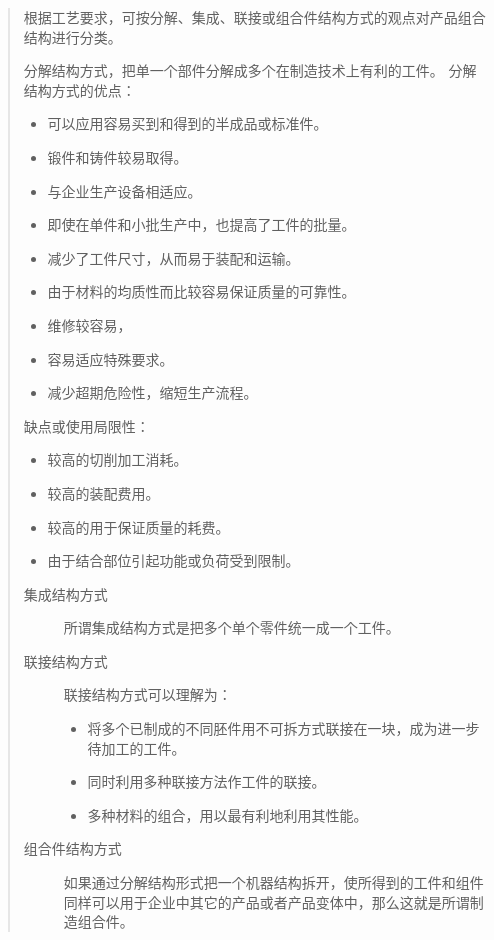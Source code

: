 \documentclass[letterpaper,10pt,english]{sphinxmanual}
\begin{document}
\begin{quote}

根据工艺要求，可按分解、集成、联接或组合件结构方式的观点对产品组合结构进行分类。

分解结构方式，把单一个部件分解成多个在制造技术上有利的工件。
分解结构方式的优点：
\begin{itemize}
\item {} 
可以应用容易买到和得到的半成品或标准件。

\item {} 
锻件和铸件较易取得。

\item {} 
与企业生产设备相适应。

\item {} 
即使在单件和小批生产中，也提高了工件的批量。

\item {} 
减少了工件尺寸，从而易于装配和运输。

\item {} 
由于材料的均质性而比较容易保证质量的可靠性。

\item {} 
维修较容易，

\item {} 
容易适应特殊要求。

\item {} 
减少超期危险性，缩短生产流程。

\end{itemize}

缺点或使用局限性：
\begin{itemize}
\item {} 
较高的切削加工消耗。

\item {} 
较高的装配费用。

\item {} 
较高的用于保证质量的耗费。

\item {} 
由于结合部位引起功能或负荷受到限制。

\end{itemize}
\begin{description}
\item[{集成结构方式}] \leavevmode
所谓集成结构方式是把多个单个零件统一成一个工件。

\item[{联接结构方式}] \leavevmode
联接结构方式可以理解为：
\begin{itemize}
\item {} 
将多个已制成的不同胚件用不可拆方式联接在一块，成为进一步待加工的工件。

\item {} 
同时利用多种联接方法作工件的联接。

\item {} 
多种材料的组合，用以最有利地利用其性能。

\end{itemize}

\item[{组合件结构方式}] \leavevmode
如果通过分解结构形式把一个机器结构拆开，使所得到的工件和组件同样可以用于企业中其它的产品或者产品变体中，那么这就是所谓制造组合件。

\end{description}
\end{quote}
\end{document}
